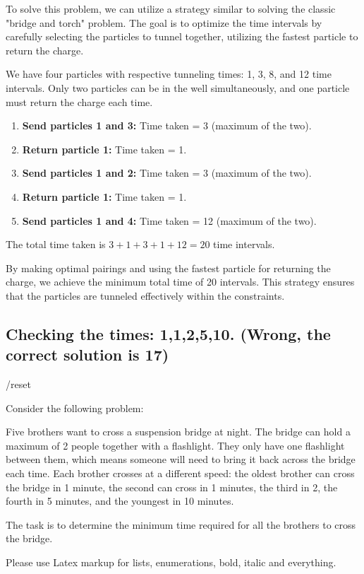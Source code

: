 \begin{airesult}
To solve this problem, we can utilize a strategy similar to solving the classic
"bridge and torch" problem. The goal is to optimize the time intervals by
carefully selecting the particles to tunnel together, utilizing the fastest
particle to return the charge.

\vsp

We have four particles with respective tunneling times: 1, 3, 8, and 12 time
intervals. Only two particles can be in the well simultaneously, and one
particle must return the charge each time.

\begin{enumerate}
  \item \textbf{Send particles 1 and 3:} Time taken = 3 (maximum of the two).
  \item \textbf{Return particle 1:} Time taken = 1.
  \item \textbf{Send particles 1 and 2:} Time taken = 3 (maximum of the two).
  \item \textbf{Return particle 1:} Time taken = 1.
  \item \textbf{Send particles 1 and 4:} Time taken = 12 (maximum of the two).
\end{enumerate}

The total time taken is \(3 + 1 + 3 + 1 + 12 = 20\) time intervals.

\vsp

By making optimal pairings and using the fastest particle for returning the
charge, we achieve the minimum total time of 20 intervals. This strategy ensures
that the particles are tunneled effectively within the constraints.
\end{airesult}

\subsection{Checking the times: 1,1,2,5,10. (Wrong, the correct solution is 17)}

\begin{ai}
/reset

Consider the following problem:

Five brothers want to cross a suspension bridge at night. The bridge can hold a
maximum of 2 people together with a flashlight. They only have one flashlight
between them, which means someone will need to bring it back across the bridge
each time. Each brother crosses at a different speed: the oldest brother can
cross the bridge in 1 minute, the second can cross in 1 minutes, the third in 2,
the fourth in 5 minutes, and the youngest in 10 minutes.

The task is to determine the minimum time required for all the brothers to cross
the bridge.

Please use Latex markup for lists, enumerations, bold, italic and everything.
\end{ai}

